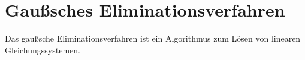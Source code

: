 \section{Gaußsches Eliminationsverfahren}
Das gaußsche Eliminationsverfahren ist ein Algorithmus zum Lösen von linearen Gleichungssystemen.
